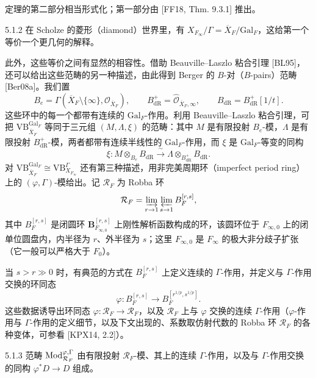 定理的第二部分相当形式化；第一部分由 [FF18, Thm. 9.3.1] 推出。

\begin{rem}{5.1.2}\label{rem:a4-5-1-2}
在 Scholze 的菱形（diamond）世界里，有 $X_{F_\infty}/\Gamma=\overline{X}_F/\mathrm{Gal}_F$，这给第一个等价一个更几何的解释。
\end{rem}

此外，这些等价之间有显然的相容性。借助 Beauville--Laszlo 粘合引理 [BL95]，还可以给出这些范畴的另一种描述，由此得到 Berger 的 $B$-对（$B$-pairs）范畴 [Ber08a]。我们置
\[
B_e=\Gamma(\overline{X}_F\setminus\{\infty\},\mathcal{O}_{\overline{X}_F}),\qquad
B^+_{\mathrm{dR}}=\widehat{\mathcal{O}}_{\overline{X}_F,\infty},\qquad
B_{\mathrm{dR}}=B^+_{\mathrm{dR}}[1/t].
\]
这些环中的每一个都带有连续的 $\mathrm{Gal}_F$-作用。利用 Beauville--Laszlo 粘合引理，可把 $\mathrm{VB}^{\mathrm{Gal}_F}_{\overline{X}_F}$ 等同于三元组 $(M,\Lambda,\xi)$ 的范畴：其中 $M$ 是有限投射 $B_e$-模，$\Lambda$ 是有限投射 $B^+_{\mathrm{dR}}$-模，两者都带有连续半线性的 $\mathrm{Gal}_F$-作用，而 $\xi$ 是 $\mathrm{Gal}_F$-等变的同构
\[
\xi:M\otimes_{B_e}B_{\mathrm{dR}}\xrightarrow{\ \sim\ }\Lambda\otimes_{B^+_{\mathrm{dR}}}B_{\mathrm{dR}}.
\]
对 $\mathrm{VB}^{\mathrm{Gal}_F}_{\overline{X}_F}\cong\mathrm{VB}^{\Gamma}_{X_{F_\infty}}$ 还有第三种描述，用非完美周期环（imperfect period ring）上的 $(\varphi,\Gamma)$-模给出。记 $\mathcal{R}_F$ 为 Robba 环
\[
\mathcal{R}_F=\varinjlim_{r\to1}\varprojlim_{s\to1}B^{[r,s]}_F,
\]
其中 $B^{[r,s]}_F$ 是闭圆环 $\mathbf{B}^{[r,s]}_{F_{\infty,0}}$ 上刚性解析函数构成的环，该圆环位于 $F_{\infty,0}$ 上的闭单位圆盘内，内半径为 $r$、外半径为 $s$；这里 $F_{\infty,0}$ 是 $F_\infty$ 的极大非分歧子扩张（它一般可以严格大于 $F_0$）。

当 $s>r\gg0$ 时，有典范的方式在 $B^{[r,s]}_F$ 上定义连续的 $\Gamma$-作用，并定义与 $\Gamma$-作用交换的环同态
\[
\varphi:B^{[r,s]}_F\to B^{[r^{1/p},s^{1/p}]}_F.
\]
这些数据诱导出环同态 $\varphi:\mathcal{R}_F\to\mathcal{R}_F$，以及 $\mathcal{R}_F$ 上与 $\varphi$ 交换的连续 $\Gamma$-作用（$\varphi$-作用与 $\Gamma$-作用的定义细节，以及下文出现的、系数取仿射代数的 Robba 环 $\mathcal{R}_F$ 的各种变体，可参看 [KPX14, 2.2]）。

\begin{defn}{5.1.3}\label{defn:a4-5-1-3}
范畴 $\operatorname{Mod}^{\varphi,\Gamma}_{\mathcal{R}_F}$ 由有限投射 $\mathcal{R}_F$-模、其上的连续 $\Gamma$-作用，以及与 $\Gamma$-作用交换的同构 $\varphi^*D\to D$ 组成。
\end{defn}

